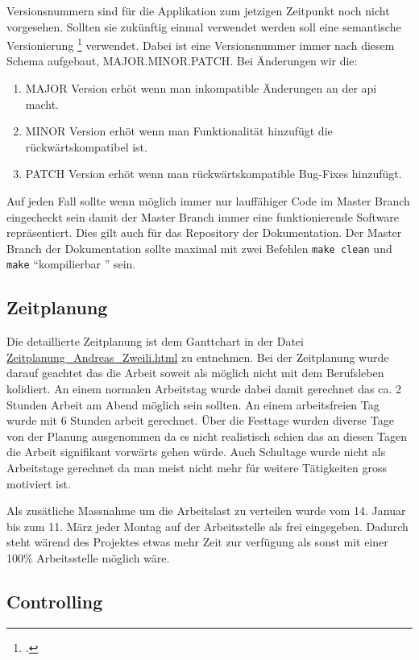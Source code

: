 Versionsnummern sind für die Applikation zum jetzigen Zeitpunkt noch nicht
vorgesehen. Sollten sie zukünftig einmal verwendet werden soll eine semantische
Versionierung \footcite{semver} verwendet. Dabei ist eine Versionsnummer immer
nach diesem Schema aufgebaut, MAJOR.MINOR.PATCH. Bei Änderungen wir die:
\begin{enumerate}
\item MAJOR Version erhöt wenn man inkompatible Änderungen an der \gls{api} macht.
\item MINOR Version erhöt wenn man Funktionalität hinzufügt die
rückwärtskompatibel ist.
\item PATCH Version erhöt wenn man rückwärtskompatible Bug-Fixes hinzufügt.
\end{enumerate}

Auf jeden Fall sollte wenn möglich immer nur lauffähiger Code im Master Branch
eingecheckt sein damit der Master Branch immer eine funktionierende Software
repräsentiert. Dies gilt auch für das Repository der Dokumentation. Der Master
Branch der Dokumentation sollte maximal mit zwei Befehlen \texttt{make clean} und
\texttt{make} "`kompilierbar "' sein.

\subsection{Zeitplanung}
\label{sec:orgb1efd39}

Die detaillierte Zeitplanung ist dem Ganttchart in der Datei
\href{Zeitplanung\_Andreas\_Zweili.html}{Zeitplanung\_Andreas\_Zweili.html} zu entnehmen. Bei der Zeitplanung wurde darauf
geachtet das die Arbeit soweit als möglich nicht mit dem Berufsleben kolidiert.
An einem normalen Arbeitstag wurde dabei damit gerechnet das ca. 2 Stunden
Arbeit am Abend möglich sein sollten. An einem arbeitsfreien Tag wurde mit 6
Stunden arbeit gerechnet. Über die Festtage wurden diverse Tage von der Planung
ausgenommen da es nicht realistisch schien das an diesen Tagen die Arbeit
signifikant vorwärts gehen würde. Auch Schultage wurde nicht als Arbeitstage
gerechnet da man meist nicht mehr für weitere Tätigkeiten gross motiviert ist.

Als zusätliche Massnahme um die Arbeitslast zu verteilen wurde vom 14. Januar
bis zum 11. März jeder Montag auf der Arbeitsstelle als frei eingegeben.
Dadurch steht wärend des Projektes etwas mehr Zeit zur verfügung als sonst mit
einer 100\% Arbeitsstelle möglich wäre.

\subsection{Controlling}
\label{sec:orgdc0083e}

